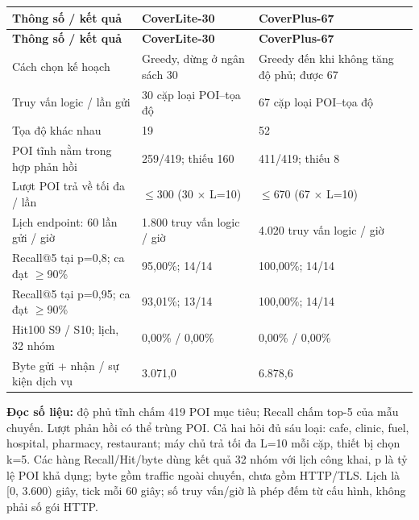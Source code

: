 \begingroup\small
\begin{longtable}{@{}P{5.612cm}P{5.513cm}P{5.513cm}@{}}
\toprule
\textbf{Thông số / kết quả} & \textbf{CoverLite-30} & \textbf{CoverPlus-67}\\\midrule
\endfirsthead
\toprule
\textbf{Thông số / kết quả} & \textbf{CoverLite-30} & \textbf{CoverPlus-67}\\\midrule
\endhead
\bottomrule\endfoot
Cách chọn kế hoạch & Greedy, dừng ở ngân sách 30 & Greedy đến khi không tăng độ phủ; được 67\\
\addlinespace[3pt]
Truy vấn logic / lần gửi & 30 cặp loại POI–tọa độ & 67 cặp loại POI–tọa độ\\
\addlinespace[3pt]
Tọa độ khác nhau & 19 & 52\\
\addlinespace[3pt]
POI tĩnh nằm trong hợp phản hồi & 259/419; thiếu 160 & 411/419; thiếu 8\\
\addlinespace[3pt]
Lượt POI trả về tối đa / lần & $\le$300 (30 $\times$ L=10) & $\le$670 (67 $\times$ L=10)\\
\addlinespace[3pt]
Lịch endpoint: 60 lần gửi / giờ & 1.800 truy vấn logic / giờ & 4.020 truy vấn logic / giờ\\
\addlinespace[3pt]
Recall@5 tại p=0,8; ca đạt $\ge$90\% & 95,00\%; 14/14 & 100,00\%; 14/14\\
\addlinespace[3pt]
Recall@5 tại p=0,95; ca đạt $\ge$90\% & 93,01\%; 13/14 & 100,00\%; 14/14\\
\addlinespace[3pt]
Hit100 S9 / S10; lịch, 32 nhóm & 0,00\% / 0,00\% & 0,00\% / 0,00\%\\
\addlinespace[3pt]
Byte gửi + nhận / sự kiện dịch vụ & 3.071,0 & 6.878,6\\
\end{longtable}
\endgroup
\textbf{Đọc số liệu:} độ phủ tĩnh chấm 419 POI mục tiêu; Recall chấm top-5 của mẫu chuyến. Lượt phản hồi có thể trùng POI. Cả hai hỏi đủ sáu loại: cafe, clinic, fuel, hospital, pharmacy, restaurant; máy chủ trả tối đa L=10 mỗi cặp, thiết bị chọn k=5. Các hàng Recall/Hit/byte dùng kết quả 32 nhóm với lịch công khai, p là tỷ lệ POI khả dụng; byte gồm traffic ngoài chuyến, chưa gồm HTTP/TLS. Lịch là [0, 3.600) giây, tick mỗi 60 giây; số truy vấn/giờ là phép đếm từ cấu hình, không phải số gói HTTP.


